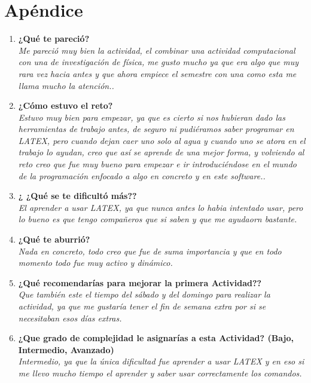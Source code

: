 \documentclass[12pt]{article}
\begin{document}
\section{Apéndice}
\begin{enumerate}
\item \textbf{¿Qué te pareció?}\\
\textit{Me pareció muy bien la actividad, el combinar una actividad computacional con una de investigación de física, me gusto mucho ya que era algo que muy rara vez hacia antes y que ahora empiece el semestre con una como esta me llama mucho la atención..}

\item \textbf{¿Cómo estuvo el reto?}\\
\textit{Estuvo muy bien para empezar, ya que es cierto si nos hubieran dado las herramientas de trabajo antes, de seguro ni pudiéramos saber programar en LATEX, pero cuando dejan caer uno solo al agua y cuando uno se atora en el trabajo lo ayudan, creo que así se aprende de una mejor forma, y volviendo al reto creo que fue muy bueno para empezar e ir introduciéndose en el mundo de la programación enfocado a algo en concreto y en este software..}

\item \textbf{¿ ¿Qué se te dificultó más??} \\
\textit{El aprender a usar LATEX, ya que nunca antes lo habia intentado usar, pero lo bueno es que tengo compañeros que si saben y que me ayudaorn bastante.}

\item \textbf{¿Qué te aburrió?}\\
\textit{Nada en concreto, todo creo que fue de suma importancia y que en todo momento todo fue muy activo y dinámico.}

\item \textbf{¿Qué recomendarías para mejorar la primera Actividad?? }\\
\textit{Que también este el tiempo del sábado y del domingo para realizar la actividad, ya que me gustaría tener el fin de semana extra por si se necesitaban esos días extras.}

\item \textbf{¿Que grado de complejidad le asignarías a esta Actividad? (Bajo, Intermedio, Avanzado)} \\
\textit{Intermedio, ya que la única dificultad fue aprender a usar LATEX y en eso si me llevo mucho tiempo el aprender y saber usar correctamente los comandos.}

\end{enumerate}
\end{document}

